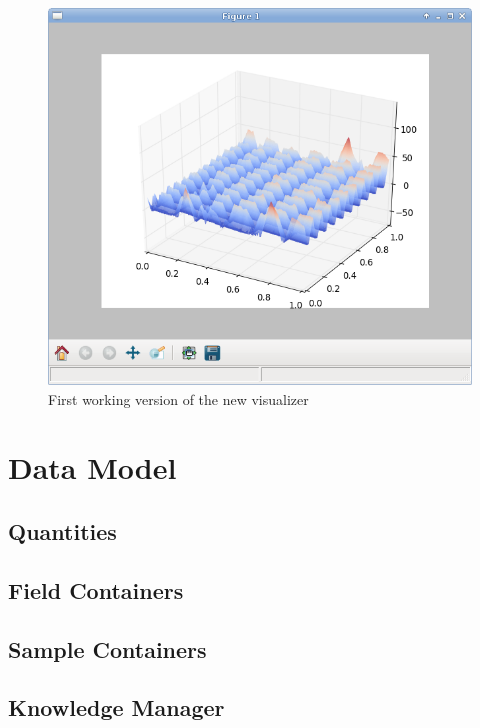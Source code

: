 \documentclass[a4paper]{article}
\begin{document}
\begin{figure}[h]
  \centering
  \includegraphics[scale=0.75]{fig/gui_surface_vis.png}
  \caption{First working version of the new visualizer}
  \label{fig:gui_surface_vis}
\end{figure}


\FloatBarrier
\section{Data Model}
\label{sec:data_model}

\subsection{Quantities}
\label{sec:data_model_quantities}

\subsection{Field Containers}
\label{sec:data_model_fcs}

\subsection{Sample Containers}
\label{sec:data_model_scs}

\subsection{Knowledge Manager}
\label{sec:data_model_knowledge_manager}
\end{document}
